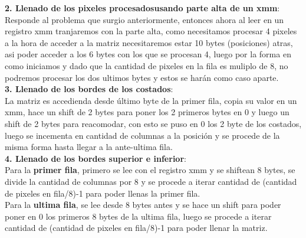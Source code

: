\textbf{2. Llenado de los pixeles procesadosusando parte alta de un xmm}:\\ Responde al problema que surgio anteriormente, entonces ahora al leer en un registro xmm tranjaremos con la parte alta, como necesitamos procesar 4 pixeles a la hora de acceder a la matriz necesitaremos estar 10 bytes (posiciones) atras, asi poder acceder a los 6 bytes con los que se procesan 4, luego por la forma en como iniciamos y dado que la cantidad de pixeles en la fila es muliplo de 8, no podremos  procesar los dos ultimos bytes y estos se harán como caso aparte.\\

\textbf{3. Llenado de los bordes de los costados}:\\ La matriz es accedienda desde último byte de la primer fila, copia su valor en un xmm, hace un shift de 2 bytes para poner los 2 primeros bytes en 0 y luego un shift de 2 bytes para reacomodar, con esto se puso en 0 los 2 byte de los costados, luego se incementa en cantidad de columnas a la posición y se procede de la misma forma hasta llegar a la ante-ultima fila.\\

\textbf{4. Llenado de los bordes superior e inferior}:\\
	Para la \textbf{primer fila}, primero se lee con el registro xmm y se shiftean 8 bytes, se divide la cantidad de columnas por 8 y se procede a iterar cantidad de (cantidad de pixeles en fila/8)-1 para poder llenas la primer fila.\\
	Para la \textbf{ultima fila}, se lee desde 8 bytes antes y se hace un shift para poder poner en 0 los primeros 8 bytes de la ultima fila, luego se procede a iterar cantidad de (cantidad de pixeles en fila/8)-1 para poder llenar la matriz.\\


